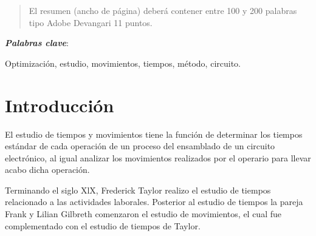     \maketitle
    \thispagestyle{fancy}
    
    
    
    \begin{abstract}
    \noindent 
    El resumen (ancho de página) deberá contener entre 100 y 200 palabras tipo Adobe Devangari 11 puntos.
    
    \end{abstract}
    \textbf{\textit{Palabras clave}}: 
    
    Optimización, estudio, movimientos, tiempos, método, circuito.
    
    \section{Introducción}
    
         El estudio de tiempos y movimientos tiene la función de determinar los tiempos estándar de cada operación de un proceso del ensamblado de un circuito electrónico, al igual analizar los movimientos realizados por el operario para llevar acabo dicha operación.
    
         Terminando el siglo XlX, Frederick Taylor realizo el estudio de tiempos relacionado a las actividades laborales. Posterior al estudio de tiempos la pareja Frank y Lilian Gilbreth comenzaron el estudio de movimientos, el cual fue complementado con el estudio de tiempos de Taylor.\cite{niebel1980ingenieria}
         
